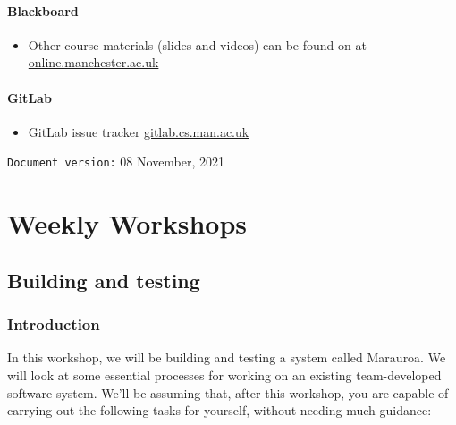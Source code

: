 \documentclass[
]{book}
\providecommand{\tightlist}{%
  \setlength{\itemsep}{0pt}\setlength{\parskip}{0pt}}
\begin{document}
\hypertarget{blackboard}{%
\subsection{Blackboard}\label{blackboard}}

\begin{itemize}
\tightlist
\item
  Other course materials (slides and videos) can be found on at \href{https://online.manchester.ac.uk/}{online.manchester.ac.uk}
\end{itemize}

\hypertarget{gitlab}{%
\subsection{GitLab}\label{gitlab}}

\begin{itemize}
\tightlist
\item
  GitLab issue tracker \href{https://gitlab.cs.man.ac.uk/}{gitlab.cs.man.ac.uk}
\end{itemize}

























\texttt{Document\ version:} 08 November, 2021

\hypertarget{part-weekly-workshops}{%
\part{Weekly Workshops}\label{part-weekly-workshops}}

\hypertarget{building}{%
\chapter{Building and testing}\label{building}}

\hypertarget{Introduction}{%
\section{Introduction}\label{Introduction}}

In this workshop, we will be building and testing a system called Marauroa. We will look at some essential processes for working on an existing team-developed software system. We'll be assuming that, after this workshop, you are capable of carrying out the following tasks for yourself, without needing much guidance:
\end{document}
